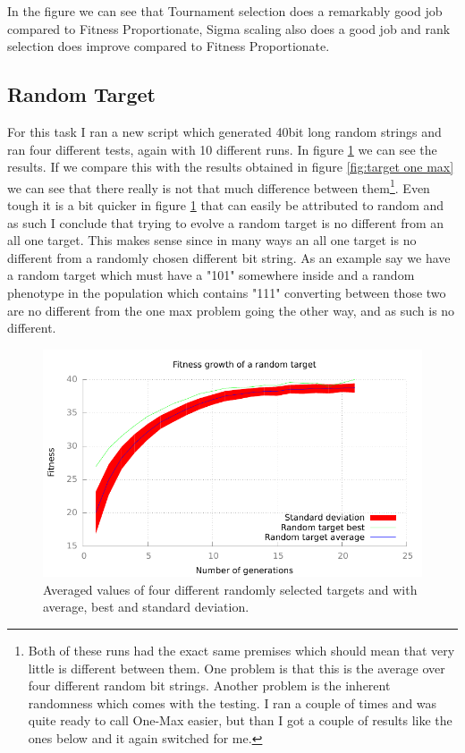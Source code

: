 In the figure we can see that Tournament selection does a remarkably good job
compared to Fitness Proportionate, Sigma scaling also does a good job and rank
selection does improve compared to Fitness Proportionate.

\subsection{Random Target}\label{sec:random target}
For this task I ran a new script which generated 40bit long random strings and
ran four different tests, again with 10 different runs. In figure
\ref{fig:random target} we can see the results. If we compare this with the
results obtained in figure \ref{fig:target one max} we can see that there really is
not that much difference between them\footnote{Both of these runs had the exact
	same premises which should mean that very little is different between
	them. One problem is that this is the average over four different random
	bit strings. Another problem is the inherent randomness which comes with
the testing. I ran a couple of times and was quite ready to call One-Max easier,
but than I got a couple of results like the ones below and it again switched for
me.}. Even tough it is a bit quicker in figure
\ref{fig:random target} that can easily be attributed to random and as such I
conclude that trying to evolve a random target is no different from an all one
target. This makes sense since in many ways an all one target is no different
from a randomly chosen different bit string. As an example say we have a random
target which must have a "101" somewhere inside and a random phenotype in the
population which contains "111" converting between those two are no different from the
one max problem going the other way, and as such is no different.

\begin{figure}[h!]
	\includegraphics{../graphs/fitness_target_random.pdf}
	\caption{Averaged values of four different randomly selected targets and
	with average, best and standard deviation.}
	\label{fig:random target}
\end{figure}

